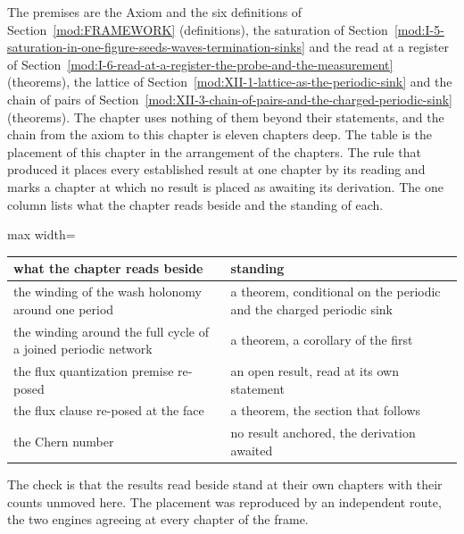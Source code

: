\begin{chproof}[instrument]
The premises are the Axiom and the six definitions of Section~\ref{mod:FRAMEWORK} (definitions), the saturation of Section~\ref{mod:I-5-saturation-in-one-figure-seeds-waves-termination-sinks} and the read at a register of Section~\ref{mod:I-6-read-at-a-register-the-probe-and-the-measurement} (theorems), the lattice of Section~\ref{mod:XII-1-lattice-as-the-periodic-sink} and the chain of pairs of Section~\ref{mod:XII-3-chain-of-pairs-and-the-charged-periodic-sink} (theorems). The chapter uses nothing of them beyond their statements, and the chain from the axiom to this chapter is eleven chapters deep.
The table is the placement of this chapter in the arrangement of the chapters. The rule that produced it places every established result at one chapter by its reading and marks a chapter at which no result is placed as awaiting its derivation. The one column lists what the chapter reads beside and the standing of each.
\begin{center}
\begin{adjustbox}{max width=\linewidth}\begin{tabular}{ll}
\hline
what the chapter reads beside & standing \\
\hline
the winding of the wash holonomy around one period & a theorem, conditional on the periodic and the charged periodic sink \\
the winding around the full cycle of a joined periodic network & a theorem, a corollary of the first \\
the flux quantization premise re-posed & an open result, read at its own statement \\
the flux clause re-posed at the face & a theorem, the section that follows \\
the Chern number & no result anchored, the derivation awaited \\
\hline
\end{tabular}\end{adjustbox}
\end{center}
The check is that the results read beside stand at their own chapters with their counts unmoved here.
The placement was reproduced by an independent route, the two engines agreeing at every chapter of the frame.
\end{chproof}


